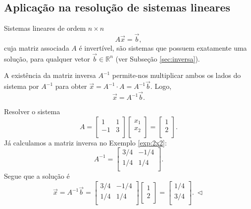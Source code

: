 \subsection{Aplicação na resolução de sistemas lineares}


Sistemas lineares de ordem $n \times n$
\begin{equation}
A \vec{x} = \vec{b},
\end{equation} cuja matriz associada $A$ é invertível, são sistemas que possuem exatamente uma solução, para qualquer vetor $\vec{b} \in \mathbb{R}^n$ (ver Subseção \ref{sec:inversa}).

A existência da matriz inversa $A^{-1}$ permite-nos multiplicar ambos os lados do sistema por $A^{-1}$ para obter $\vec{x} = A^{-1} \cdot A = A^{-1} \vec{b}.$ Logo,
\begin{equation}
\boxed{\vec{x} = A^{-1} \vec{b}.}
\end{equation}


\begin{ex}
	Resolver o sistema
	\begin{equation}
	A = \left[
	\begin{array}{cc}
	1 & 1  \\
	-1 & 3 \\
	\end{array}
	\right] \left[
	\begin{array}{c}
	x_1  \\
	x_2 \\
	\end{array}
	\right] =
	\left[
	\begin{array}{c}
	1  \\
	2 \\
	\end{array}
	\right].
	\end{equation} Já calculamos a matriz inversa no Exemplo \ref{exp:2x2}:
	\begin{equation}
	A^{-1}  =
	\left[
	\begin{array}{cc}
	3/4 & -1/4  \\
	1/4 & 1/4 \\
	\end{array}
	\right].
	\end{equation} Segue que a solução é
	\begin{equation}
	\vec{x} = A^{-1} \vec{b} =
	\left[
	\begin{array}{cc}
	3/4 & -1/4  \\
	1/4 & 1/4 \\
	\end{array}
	\right]\left[
	\begin{array}{c}
	1  \\
	2 \\
	\end{array}
	\right] =
	\left[
	\begin{array}{c}
	1/4 \\
	3/4 \\
	\end{array}
	\right]. \ \lhd
	\end{equation}
\end{ex}


